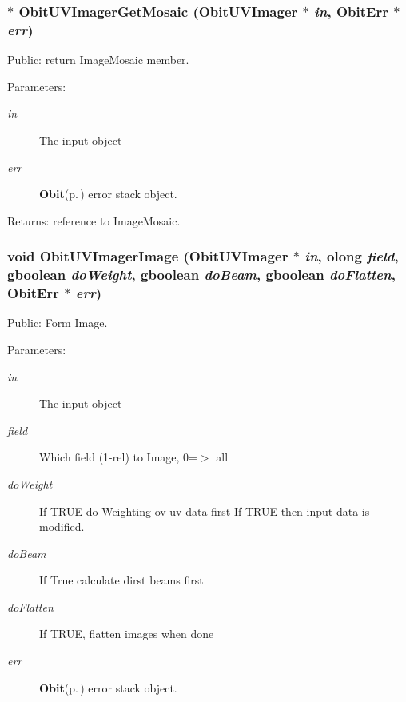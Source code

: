 \subsubsection{$\ast$ Obit\-UVImager\-Get\-Mosaic ({\bf Obit\-UVImager} $\ast$ {\em in}, {\bf Obit\-Err} $\ast$ {\em err})}\label{ObitUVImager_8c_a16}


Public: return Image\-Mosaic member. 

\begin{Desc}
\item[Parameters:]
\begin{description}
\item[{\em in}]The input object \item[{\em err}]{\bf Obit}{\rm (p.\,\pageref{structObit})} error stack object. \end{description}
\end{Desc}
\begin{Desc}
\item[Returns:]reference to Image\-Mosaic. \end{Desc}
\subsubsection{\setlength{\rightskip}{0pt plus 5cm}void Obit\-UVImager\-Image ({\bf Obit\-UVImager} $\ast$ {\em in}, {\bf olong} {\em field}, gboolean {\em do\-Weight}, gboolean {\em do\-Beam}, gboolean {\em do\-Flatten}, {\bf Obit\-Err} $\ast$ {\em err})}\label{ObitUVImager_8c_a14}


Public: Form Image. 

\begin{Desc}
\item[Parameters:]
\begin{description}
\item[{\em in}]The input object \item[{\em field}]Which field (1-rel) to Image, 0=$>$ all \item[{\em do\-Weight}]If TRUE do Weighting ov uv data first If TRUE then input data is modified. \item[{\em do\-Beam}]If True calculate dirst beams first \item[{\em do\-Flatten}]If TRUE, flatten images when done \item[{\em err}]{\bf Obit}{\rm (p.\,\pageref{structObit})} error stack object. \end{description}
\end{Desc}
